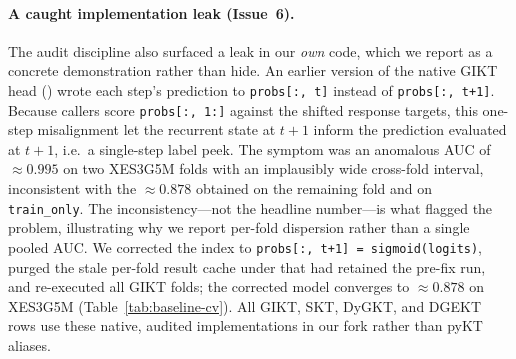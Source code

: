 \documentclass[pdflatex,sn-basic]{sn-jnl}
\begin{document}
\paragraph{A caught implementation leak (Issue~6).}
The audit discipline also surfaced a leak in our \emph{own} code, which we
report as a concrete demonstration rather than hide. An earlier version of
the native GIKT head () wrote each step's prediction
to \texttt{probs[:,\,t]} instead of \texttt{probs[:,\,t+1]}. Because callers
score \texttt{probs[:,\,1:]} against the shifted response targets, this
one-step misalignment let the recurrent state at $t{+}1$ inform the prediction
evaluated at $t{+}1$, i.e.\ a single-step label peek. The symptom was an
anomalous AUC of ${\approx}0.995$ on two XES3G5M folds with an implausibly wide
cross-fold interval, inconsistent with the ${\approx}0.878$ obtained on the
remaining fold and on \texttt{train\_only}. The inconsistency---not the
headline number---is what flagged the problem, illustrating why we report
per-fold dispersion rather than a single pooled AUC. We corrected the index to
\texttt{probs[:,\,t+1]\,=\,sigmoid(logits)}, purged the stale per-fold result
cache under  that had retained the pre-fix run, and
re-executed all GIKT folds; the corrected model converges to
${\approx}0.878$ on XES3G5M (Table~\ref{tab:baseline-cv}). All GIKT, SKT,
DyGKT, and DGEKT rows use these native, audited implementations in our fork
rather than pyKT aliases.
\end{document}
